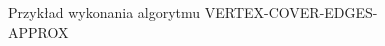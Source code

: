 \begin{figure}[tbh]

\caption{Przykład wykonania algorytmu VERTEX-COVER-EDGES-APPROX}
\label{vertex-cover-edges-approx_example}
\end{figure}